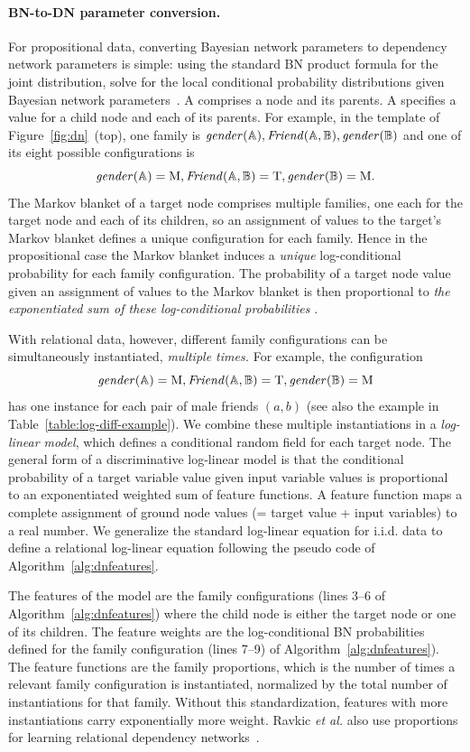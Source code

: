 \documentclass[runningheads,a4paper]{llncs}
\begin{document}
\paragraph{BN-to-DN parameter conversion.}  For propositional data, converting Bayesian network parameters to dependency network parameters is simple: using the standard BN product formula for the joint distribution, solve for the local conditional probability distributions given Bayesian network parameters~\cite[Ch.14.5.2]{Russell2010}. A  comprises a node and its parents. A  specifies a value for a child node and each of its parents. For example, in the template of Figure~\ref{fig:dn}~(top), one family is $\it{gender}(\mathbb{A}), \it{Friend}(\mathbb{A},\mathbb{B}), \it{gender}(\mathbb{B})$ and one of its eight possible configurations is
$$\it{gender}(\mathbb{A}) = \mathrm{M}, \it{Friend}(\mathbb{A},\mathbb{B}) = \mathrm{T}, \it{gender}(\mathbb{B}) = \mathrm{M}.$$
The Markov blanket of a target node comprises multiple families, one each for the target node and each of its children, so
an assignment of values to the target's Markov blanket defines a unique configuration for each family. Hence in the propositional case the Markov blanket induces a {\em unique} log-conditional probability for each family configuration. The probability of a target node value given an assignment of values to the Markov blanket is then proportional to {\em the exponentiated sum of these log-conditional probabilities} \cite[Ch.14.5.2]{Russell2010}.

With relational data, however, different family configurations can be simultaneously instantiated, {\em multiple times.}  For example, the configuration $$\it{gender}(\mathbb{A}) = \mathrm{M}, \it{Friend}(\mathbb{A},\mathbb{B}) = \mathrm{T}, \it{gender}(\mathbb{B}) = \mathrm{M}$$ has one instance for each pair of male friends $(a,b)$ (see also the example in Table~\ref{table:log-diff-example}).
We combine these multiple instantiations in a {\em log-linear model}, which defines a conditional random field for each target node. The general form of a discriminative log-linear model \cite{Sutton2007} is that the conditional probability of a target variable value given input variable values is proportional to an exponentiated weighted sum of feature functions. A feature function maps a complete assignment of ground node values (= target value + input variables) to a real number. 
We generalize the standard log-linear equation for i.i.d. data to define a relational log-linear equation following the pseudo code of Algorithm~\ref{alg:dnfeatures}. 


The features of the model are the family configurations (lines 3--6 of Algorithm~\ref{alg:dnfeatures}) where the child node is either the target node or one of its children. The feature weights are the log-conditional BN probabilities defined for the family configuration (lines 7--9) of Algorithm~\ref{alg:dnfeatures}). The feature functions are the family proportions, which is the number of times a relevant family configuration is instantiated, normalized by the total number of instantiations for that family. Without this standardization, features with more instantiations carry exponentially more weight. Ravkic {\em et al.} also use proportions for learning relational dependency networks~\cite{Ravkic2015}.
\end{document}
